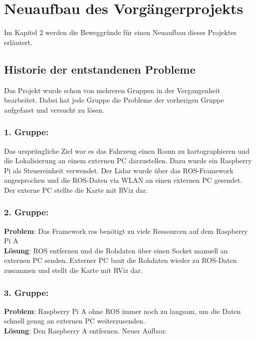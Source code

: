 

\chapter{Neuaufbau des Vorgängerprojekts}

Im Kapitel 2 werden die Beweggründe für einen Neuaufbau dieses Projektes erläutert.




\section{Historie der entstandenen Probleme}

Das Projekt wurde schon von mehreren Gruppen in der Vergangenheit bearbeitet. Dabei hat jede Gruppe die Probleme der vorherigen Gruppe aufgefasst und versucht zu lösen. 

\subsection*{1. Gruppe:} 

Das ursprüngliche Ziel war es das Fahrzeug einen Raum zu kartographieren und die Lokalisierung an einem externen PC darzustellen. Dazu wurde ein Raspberry Pi als Steuereinheit verwendet. Der Lidar wurde über das ROS-Framework angesprochen und die ROS-Daten via WLAN an einen externen PC gesendet. Der externe PC stellte die Karte mit RViz dar.

\subsection*{2. Gruppe:} 

\textbf{Problem}: Das Framework \acrfull{ros} benötigt zu viele Ressourcen auf dem Raspberry Pi A\\
\textbf{Lösung}: ROS entfernen und die Rohdaten über einen Socket manuell an externen PC senden. Externer PC baut die Rohdaten wieder zu ROS-Daten zusammen und stellt die Karte mit RViz dar.

\subsection*{3. Gruppe:} 

\textbf{Problem}: Raspberry Pi A ohne ROS immer noch zu langsam, um die Daten schnell genug an externen PC weiterzusenden.\\
\textbf{Lösung}: Den Raspberry A entfernen. Neuer Aufbau:

